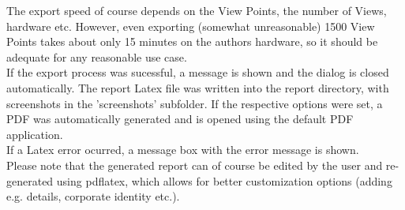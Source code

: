 The export speed of course depends on the View Points, the number of Views, hardware etc. However, even exporting (somewhat unreasonable) 1500 View Points takes about only 15 minutes on the authors hardware, so it should be adequate for any reasonable use case. \\

If the export process was sucessful, a message is shown and the dialog is closed automatically. The report Latex file was written into the report directory, with screenshots in the 'screenshots' subfolder. If the respective options were set, a PDF was automatically generated and is opened using the default PDF application. \\

If a Latex error ocurred, a message box with the error message is shown. \\

Please note that the generated report can of course be edited by the user and re-generated using pdflatex, which allows for better customization options (adding e.g. details, corporate identity etc.).

